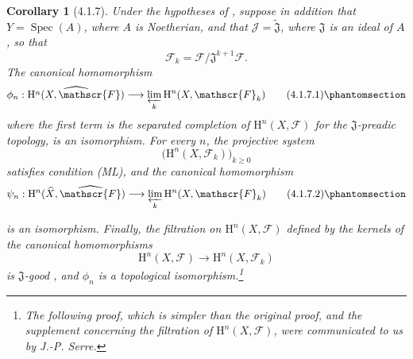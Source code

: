 \documentclass[oneside]{amsart}
\theoremstyle{ega-env-style}
\theoremstyle{ega-thm-env-style}
\newtheorem*{corollary}{Corollary}
\theoremstyle{ega-defn-env-style}
\def\mathcal{\mathscr}
\def\sh{\mathcal}                   %
\def\geq{\geqslant}                 %
\def\vphi{\phi}                     %
\def\HH{\mathrm{H}}                 %
\def\Spec{\operatorname{Spec}}
\newcommand{\oldpage}[2][]{{\marginnote{\normalfont{\textbf{#1}~|~#2}}}\ignorespaces}
\let\EGAOriginalLabel\label
\renewcommand{\label}[1]{\phantomsection\EGAOriginalLabel{#1}}
\begin{document}
\begin{corollary}[4.1.7]
\label{III.4.1.7}
Under the hypotheses of , suppose in addition that
$Y=\Spec(A)$, where $A$ is Noetherian, and that
$\sh{J}=\widetilde{\mathfrak{J}}$, where $\mathfrak{J}$ is an ideal
of $A$, so that
\[
  \sh{F}_k=\sh{F}/\mathfrak{J}^{k+1}\sh{F}.
\]
The canonical homomorphism
\[
  \vphi_n:
  \widehat{\HH^n(X,\sh{F})}
  \longrightarrow
  \varprojlim_k\HH^n(X,\sh{F}_k)
  \tag{4.1.7.1}
  \label{III.4.1.7.1}
\]
where the first term is the separated completion of
$\HH^n(X,\sh{F})$ for the $\mathfrak{J}$-preadic topology, is an
isomorphism.
For every $n$, the projective system
\[
  \bigl(\HH^n(X,\sh{F}_k)\bigr)_{k\geq0}
\]
satisfies condition \emph{(ML)}, and the canonical homomorphism
\[
  \psi_n:
  \HH^n(\widehat{X},\widehat{\sh{F}})
  \longrightarrow
  \varprojlim_k\HH^n(X,\sh{F}_k)
  \tag{4.1.7.2}
  \label{III.4.1.7.2}
\]

\oldpage[III]{126}

is an isomorphism.
Finally, the filtration on $\HH^n(X,\sh{F})$ defined by the kernels
of the canonical homomorphisms
\[
  \HH^n(X,\sh{F})\longrightarrow\HH^n(X,\sh{F}_k)
\]
is $\mathfrak{J}$-good , and $\vphi_n$ is a
topological isomorphism.\footnote{The following proof, which is
simpler than the original proof, and the supplement concerning the
filtration of $\HH^n(X,\sh{F})$, were communicated to us by
J.-P. Serre.}
\end{corollary}
\end{document}
